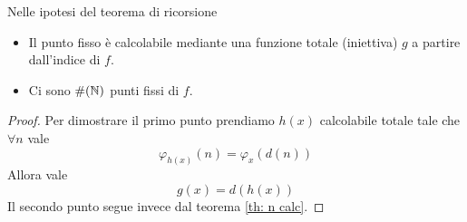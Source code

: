 \begin{property}
	Nelle ipotesi del teorema di ricorsione
	\begin{itemize}
		\item Il punto fisso è calcolabile mediante una funzione
		      totale (iniettiva) $g$ a partire dall'indice di
		      $f$.
		\item Ci sono $\# (\mathbb{N})$ punti fissi di $f$.
	\end{itemize}
	\begin{proof}
		Per dimostrare il primo punto prendiamo $h(x)$
		calcolabile totale tale che $\forall n$ vale
		\[ \varphi_{h(x)} (n) = \varphi_x (d(n)) \]
		Allora vale
		\[ g(x) = d(h(x)) \]
		Il secondo punto segue invece dal teorema
		\ref{th: n calc}.
	\end{proof}
\end{property}

